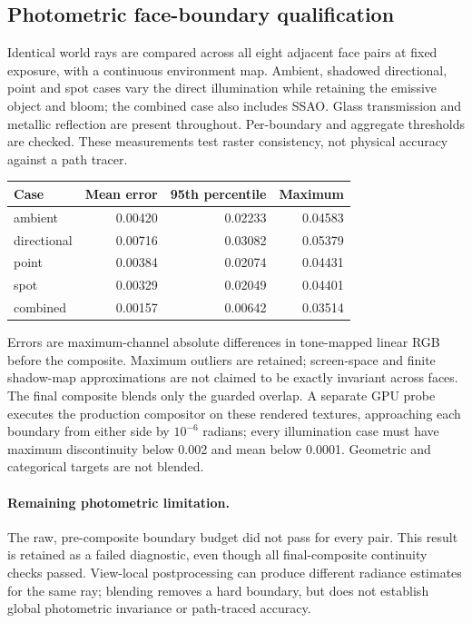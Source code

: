 \subsection{Photometric face-boundary qualification}
Identical world rays are compared across all eight adjacent face pairs at fixed exposure, with a continuous environment map. Ambient, shadowed directional, point and spot cases vary the direct illumination while retaining the emissive object and bloom; the combined case also includes SSAO. Glass transmission and metallic reflection are present throughout. Per-boundary and aggregate thresholds are checked. These measurements test raster consistency, not physical accuracy against a path tracer.
\begin{center}\begin{tabular}{lrrr}\toprule
Case & Mean error & 95th percentile & Maximum \\
\midrule
ambient & 0.00420 & 0.02233 & 0.04583 \\
directional & 0.00716 & 0.03082 & 0.05379 \\
point & 0.00384 & 0.02074 & 0.04431 \\
spot & 0.00329 & 0.02049 & 0.04401 \\
combined & 0.00157 & 0.00642 & 0.03514 \\
\bottomrule\end{tabular}\end{center}
Errors are maximum-channel absolute differences in tone-mapped linear RGB before the composite. Maximum outliers are retained; screen-space and finite shadow-map approximations are not claimed to be exactly invariant across faces. The final composite blends only the guarded overlap. A separate GPU probe executes the production compositor on these rendered textures, approaching each boundary from either side by $10^{-6}$ radians; every illumination case must have maximum discontinuity below 0.002 and mean below 0.0001. Geometric and categorical targets are not blended.
\paragraph{Remaining photometric limitation.} The raw, pre-composite boundary budget did not pass for every pair. This result is retained as a failed diagnostic, even though all final-composite continuity checks passed. View-local postprocessing can produce different radiance estimates for the same ray; blending removes a hard boundary, but does not establish global photometric invariance or path-traced accuracy.
